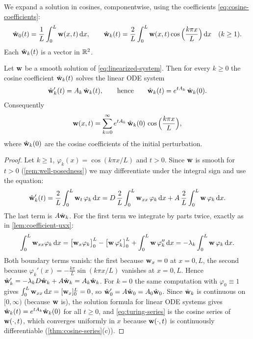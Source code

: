 We expand a solution in cosines, componentwise, using the coefficients
\eqref{eq:cosine-coefficients}:
\begin{equation*}
  \hat{\mathbf{w}}_0(t) = \frac1L\int_0^L \mathbf{w}(x,t)\,\mathrm{d} x,\qquad
  \hat{\mathbf{w}}_k(t) = \frac2L\int_0^L \mathbf{w}(x,t)\cos\Big(\frac{k\pi x}{L}\Big)\,\mathrm{d} x
  \quad (k\ge1).
\end{equation*}
Each $\hat{\mathbf{w}}_k(t)$ is a vector in $\mathbb{R}^2$.

\begin{theorem}\label{thm:modal-decomposition}
Let $\mathbf{w}$ be a smooth solution of \eqref{eq:linearized-system}. Then for every
$k\ge0$ the cosine coefficient $\hat{\mathbf{w}}_k(t)$ solves the linear ODE system
\begin{equation}\label{eq:mode-ode}
  \hat{\mathbf{w}}_k'(t) = A_k\,\hat{\mathbf{w}}_k(t),\qquad\text{hence}\qquad
  \hat{\mathbf{w}}_k(t) = e^{tA_k}\,\hat{\mathbf{w}}_k(0).
\end{equation}
Consequently
\begin{equation}\label{eq:turing-series}
  \mathbf{w}(x,t) = \sum_{k=0}^\infty e^{tA_k}\,\hat{\mathbf{w}}_k(0)\,\cos\Big(\frac{k\pi x}{L}\Big),
\end{equation}
where $\hat{\mathbf{w}}_k(0)$ are the cosine coefficients of the initial perturbation.
\end{theorem}

\begin{proof}
Let $k\ge1$, $\varphi_k(x)=\cos(k\pi x/L)$ and $t>0$. Since $\mathbf{w}$ is smooth for
$t>0$ (\cref{rem:well-posedness}) we may differentiate under the integral sign and
use the equation:
\begin{equation*}
  \hat{\mathbf{w}}_k'(t) = \frac2L\int_0^L \mathbf{w}_t\,\varphi_k\,\mathrm{d} x
  = D\,\frac2L\int_0^L \mathbf{w}_{xx}\,\varphi_k\,\mathrm{d} x + A\,\frac2L\int_0^L\mathbf{w}\,\varphi_k\,\mathrm{d} x .
\end{equation*}
The last term is $A\hat{\mathbf{w}}_k$. For the first term we integrate by parts twice,
exactly as in \cref{lem:coefficient-uxx}:
\begin{equation*}
  \int_0^L \mathbf{w}_{xx}\varphi_k\,\mathrm{d} x
  = \big[\mathbf{w}_x\varphi_k\big]_0^L - \big[\mathbf{w}\,\varphi_k'\big]_0^L
    + \int_0^L \mathbf{w}\,\varphi_k''\,\mathrm{d} x
  = -\lambda_k\int_0^L\mathbf{w}\,\varphi_k\,\mathrm{d} x .
\end{equation*}
Both boundary terms vanish: the first because $\mathbf{w}_x=0$ at $x=0,L$, the second
because $\varphi_k'(x)=-\frac{k\pi}{L}\sin(k\pi x/L)$ vanishes at $x=0,L$. Hence
$\hat{\mathbf{w}}_k' = -\lambda_kD\hat{\mathbf{w}}_k + A\hat{\mathbf{w}}_k = A_k\hat{\mathbf{w}}_k$. For $k=0$ the same
computation with $\varphi_0\equiv1$ gives $\int_0^L\mathbf{w}_{xx}\,\mathrm{d} x=[\mathbf{w}_x]_0^L=0$, so
$\hat{\mathbf{w}}_0'=A\hat{\mathbf{w}}_0=A_0\hat{\mathbf{w}}_0$. Since $\hat{\mathbf{w}}_k$ is continuous on $[0,\infty)$
(because $\mathbf{w}$ is), the solution formula for linear ODE systems gives
$\hat{\mathbf{w}}_k(t)=e^{tA_k}\hat{\mathbf{w}}_k(0)$ for all $t\ge0$, and \eqref{eq:turing-series} is the cosine series
of $\mathbf{w}(\cdot,t)$, which converges uniformly in $x$ because $\mathbf{w}(\cdot,t)$ is
continuously differentiable (\cref{thm:cosine-series}(c)).
\end{proof}

